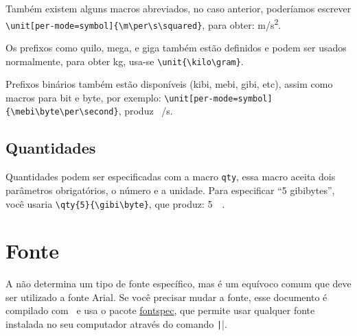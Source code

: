 Também existem alguns macros abreviados, no caso anterior, poderíamos escrever
\verb|\unit[per-mode=symbol]{\m\per\s\squared}|, para obter: \unit[per-mode=symbol]{\m\per\s\squared}.

Os prefixos como quilo, mega, e giga também estão definidos e podem ser usados normalmente, para obter
\unit{\kilo\gram}, usa-se \verb|\unit{\kilo\gram}|.

Prefixos binários também estão disponíveis (kibi, mebi, gibi, etc), assim como macros para bit e byte, por exemplo: \verb|\unit[per-mode=symbol]{\mebi\byte\per\second}|, produz \unit[per-mode=symbol]{\mebi\byte\per\second}.

\subsection{Quantidades}

Quantidades podem ser especificadas com a macro \texttt{qty}, essa macro aceita dois parâmetros obrigatórios, o número e a unidade. Para especificar \enquote{5 gibibytes}, você usaria \verb|\qty{5}{\gibi\byte}|, que produz: \qty{5}{\gibi\byte}.

\section{Fonte}

A \abnt{} não determina um tipo de fonte específico, mas é um equívoco comum que deve ser utilizado a fonte Arial. Se você precisar mudar a fonte, esse documento é compilado com \XeLaTeX\ e usa o pacote \href{https://ctan.org/pkg/fontspec}{fontspec}, que permite usar qualquer fonte instalada no seu computador através do comando \texttt|\setmainfont{Nome da Fonte}|.
